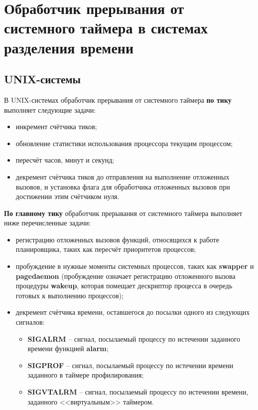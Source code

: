 \chapter{Обработчик прерывания от системного таймера в системах разделения времени}




\section{UNIX-системы}

В UNIX-системах обработчик прерывания от системного таймера \textbf{по тику} выполняет следующие задачи:

\begin{itemize}
	\item инкремент счётчика тиков;
	\item обновление статистики использования процессора текущим процессом;
	\item пересчёт часов, минут и секунд;
	\item декремент счётчика тиков до отправления на выполнение отложенных вызовов, и установка флага для обработчика отложенных вызовов при достижении этим счётчиком нуля.
\end{itemize}

\textbf{По главному тику} обработчик прерывания от системного таймера выполняет ниже перечисленные задачи:

\begin{itemize}
	\item регистрацию отложенных вызовов функций, относящихся к работе планировщика, таких как пересчёт приоритетов процессов;
	\item пробуждение в нужные моменты системных процессов, таких как \textbf{swapper} и \textbf{pagedaemon} (пробуждение означает регистрацию отложенного вызова процедуры \textbf{wakeup}, которая помещает дескриптор процесса в очередь готовых к выполнению процессов);
	\item декремент счётчика времени, оставшегося до посылки одного из следующих сигналов:
	\begin{itemize}[$\bullet$]
		\item \textbf{SIGALRM} -- сигнал, посылаемый процессу по истечении заданного времени функцией \textbf{alarm};
		\item \textbf{SIGPROF} -- сигнал, посылаемый процессу по истечении времени заданного в таймере профилирования;
		\item \textbf{SIGVTALRM} -- сигнал, посылаемый процессу по истечении времени, заданного <<виртуальным>> таймером.
	\end{itemize}
\end{itemize}

